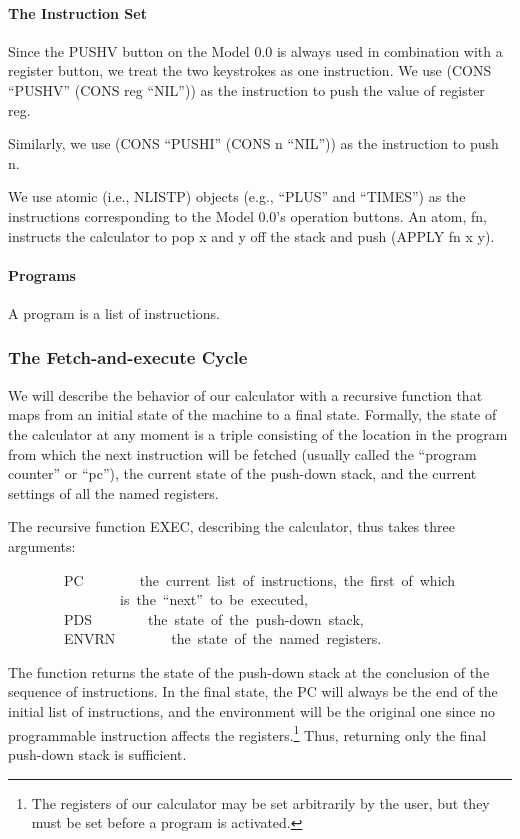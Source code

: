 \documentclass[10pt]{book}
\newenvironment{pubasis}{\begin{flushleft}}{\end{flushleft}}
\begin{document}
\paragraph{The Instruction Set}
Since the PUSHV button on the Model 0.0 is always used in
combination with a register button, we treat the two
keystrokes as one instruction.  We use (CONS ``PUSHV'' (CONS
reg ``NIL'')) as the instruction to push the value of register
reg.

Similarly, we use (CONS ``PUSHI'' (CONS n ``NIL'')) as the
instruction to push n.

We use atomic (i.e., NLISTP) objects (e.g., ``PLUS'' and ``TIMES'') as the
instructions corresponding to the Model 0.0's operation
buttons.  An atom, fn, instructs the calculator to pop x and
y off the stack and push (APPLY fn x y).

\paragraph{Programs}
A program is a list
of instructions.

\subsubsection{The Fetch-and-execute Cycle}
We will describe the behavior of our calculator with a recursive
function that maps from an initial state of the machine to a
final state.  Formally, the state of the calculator at any moment
is  a triple consisting of
the location in the program from which the next instruction
will be fetched (usually called the ``program counter'' or ``pc''),
the current state of the push-down stack, and
the current settings of all the named registers.

The recursive function EXEC, describing the calculator, thus takes
three arguments:
\begin{pubasis}
~~~~~~~~PC~~~~~~~~the~current~list~of~instructions,~the~first~of~which\\
~~~~~~~~~~~~~~~~is~the~``next''~to~be~executed,\\
~~~~~~~~PDS~~~~~~~~the~state~of~the~push-down~stack,\\
~~~~~~~~ENVRN~~~~~~~~the~state~of~the~named~registers.\\
\end{pubasis}
The function returns the state of the push-down stack at the conclusion of the
sequence of instructions.  In the final state, the PC will always
be   the end of the initial list of instructions, and the environment will
be the original one since no programmable instruction affects the
registers.\footnote{The registers of our calculator may be set arbitrarily by the user, but they must be set before a program is activated.}
Thus, returning only the final push-down stack is sufficient.
\end{document}

